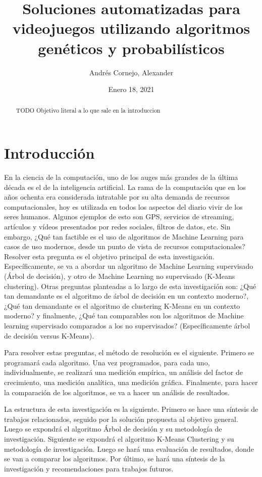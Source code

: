 \documentclass{article}
\author{Andrés Cornejo, Alexander} %
\date{Enero 18, 2021}
\title{Soluciones automatizadas para videojuegos utilizando algoritmos genéticos y probabilísticos}
\begin{document}
\maketitle

\begin{abstract}
  TODO
  Objetivo literal a lo que sale en la introduccion
\end{abstract}

\section{Introducción}
En la ciencia de la computación, uno de los auges más grandes de la última década es el de la inteligencia artificial. La rama de la computación que en los años ochenta era considerada intratable por su alta demanda de recursos computacionales, hoy es utilizada en todos los aspectos del diario vivir de los seres humanos. Algunos ejemplos de esto son GPS, servicios de streaming, artículos y vídeos presentados por redes sociales, filtros de datos, etc. Sin embargo, ¿Qué tan factible es el uso de algoritmos de Machine Learning para casos de uso modernos, desde un punto de vista de recursos computacionales? Resolver esta pregunta es el objetivo principal de esta investigación. Específicamente, se va a abordar un algoritmo de Machine Learning supervisado (Árbol de decisión), y otro de Machine Learning no supervisado (K-Means clustering). Otras preguntas planteadas a lo largo de esta investigación son: ¿Qué tan demandante es el algoritmo de árbol de decisión en un contexto moderno?, ¿Qué tan demandante es el algoritmo de clustering K-Means en un contexto moderno? y finalmente, ¿Qué tan comparables son los algoritmos de Machine learning supervisado comparados a los no supervisados? (Específicamente árbol de decisión versus K-Means).

Para resolver estas preguntas, el método de resolución es el siguiente. Primero se programará cada algoritmo. Una vez programados, para cada uno, individualmente, se realizará una medición empírica, un análisis del factor de crecimiento, una medición analítica, una medición gráfica. Finalmente, para hacer la comparación de los algoritmos, se va a hacer un análisis de resultados.

La estructura de esta investigación es la siguiente. Primero se hace una síntesis de trabajos relacionados, seguido por la solución propuesta al objetivo general. Luego se expondrá el algoritmo Árbol de decisión y su metodología de investigación. Siguiente se expondrá el algoritmo K-Means Clustering y su metodología de investigación. Luego se hará una evaluación de resultados, donde se van a comparar los algoritmos. Por último, se hará una síntesis de la investigación y recomendaciones para trabajos futuros.
\end{document}
